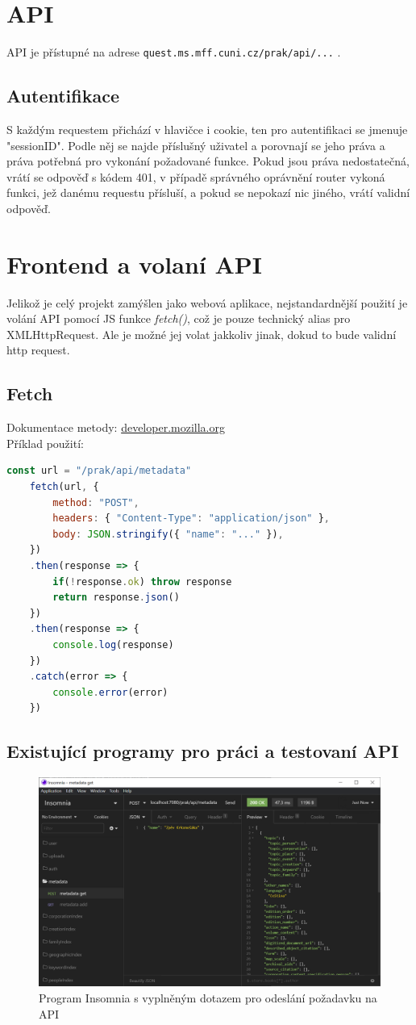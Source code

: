 \section{API}
API je přístupné na adrese \texttt{quest.ms.mff.cuni.cz/prak/api/...} .

\subsection{Autentifikace}
S každým requestem přichází v hlavičce i cookie, ten pro
autentifikaci se jmenuje "sessionID".
Podle něj se najde příslušný uživatel a porovnají se jeho práva a
práva potřebná pro vykonání požadované funkce. Pokud jsou práva nedostatečná,
vrátí se odpověď s kódem 401, v případě správného oprávnění router vykoná funkci,
jež danému requestu přísluší, a pokud se nepokazí nic jiného, vrátí validní odpověď.

\section{Frontend a volaní API}
Jelikož je celý projekt zamýšlen jako webová aplikace, nejstandardnější použití
je volání API pomocí JS funkce \textit{fetch()}, což je pouze technický alias pro XMLHttpRequest.
Ale je možné jej volat jakkoliv jinak, dokud to bude validní http request.

\subsection{Fetch}
Dokumentace metody: \href{https://developer.mozilla.org/en-US/docs/Web/API/Fetch_API}{developer.mozilla.org}
\\
Příklad použití:
\\
\begin{lstlisting}[language=JavaScript]
	const url = "/prak/api/metadata" 
	fetch(url, {
		method: "POST",
		headers: { "Content-Type": "application/json" },
		body: JSON.stringify({ "name": "..." }),
	})
	.then(response => {
		if(!response.ok) throw response
		return response.json()
	})
	.then(response => {
		console.log(response)
	})
	.catch(error => {
		console.error(error)
	})
\end{lstlisting}

\subsection{Existující programy pro práci a testovaní API}
\begin{figure}[H]
	\centering
	\includegraphics[width=.9\linewidth]{img/InsomniaExample.PNG}
	\caption{Program Insomnia s vyplněným dotazem pro odeslání požadavku na API}
\end{figure}
